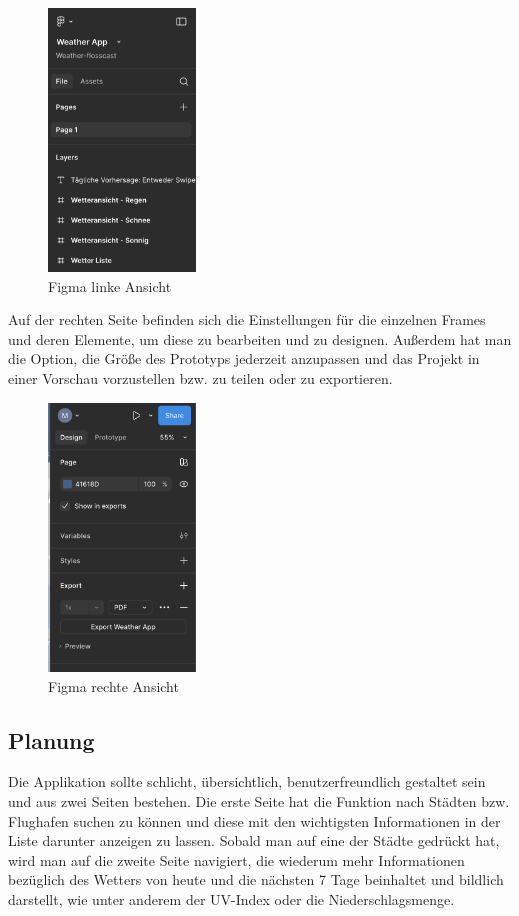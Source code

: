 \documentclass{article}
\begin{document}
\begin{figure}[ht]
\centering
\includegraphics[width=0.35\textwidth]{figma_1.png}
\caption{Figma linke Ansicht}
\end{figure}

Auf der rechten Seite befinden sich die Einstellungen für die einzelnen Frames und deren Elemente, um diese zu bearbeiten und zu designen. Außerdem hat man die Option, die Größe des Prototyps jederzeit anzupassen und das Projekt in einer Vorschau vorzustellen bzw. zu teilen oder zu exportieren.

\begin{figure}[ht]
\centering
\includegraphics[width=0.35\textwidth]{figma_2.png}
\caption{Figma rechte Ansicht}
\end{figure}

\subsection{Planung}
Die Applikation sollte schlicht, übersichtlich, benutzerfreundlich
gestaltet sein und aus zwei Seiten bestehen. Die erste Seite hat die Funktion nach Städten bzw. Flughafen suchen zu können und diese mit den wichtigsten Informationen in der Liste darunter anzeigen zu lassen. Sobald man auf eine der Städte gedrückt hat, wird man auf die zweite Seite navigiert, die wiederum mehr Informationen bezüglich des Wetters von heute und die nächsten 7 Tage beinhaltet und bildlich darstellt, wie unter anderem der UV-Index oder die Niederschlagsmenge.
\end{document}
